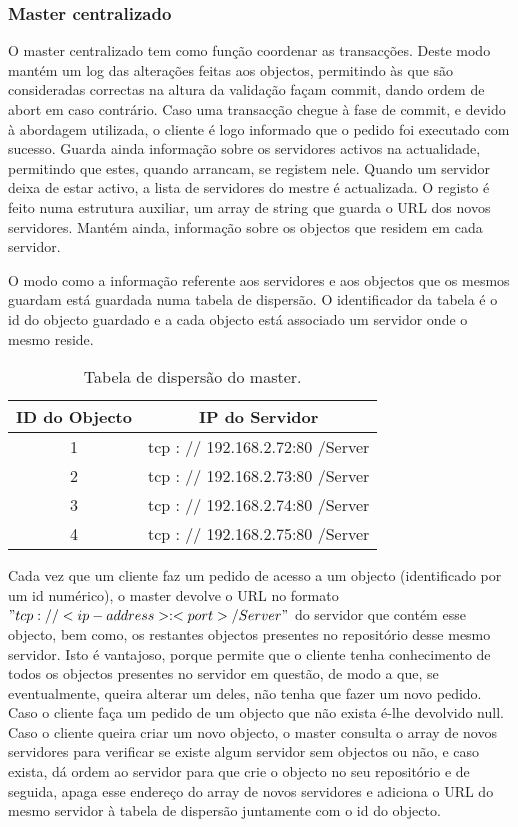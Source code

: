 \subsubsection{Master centralizado}

O master centralizado tem como função coordenar as transacções. Deste modo mantém um log das alterações feitas aos objectos, permitindo às que são consideradas correctas na altura da validação façam commit, dando ordem de abort em caso contrário. Caso uma transacção chegue à fase de commit, e devido à abordagem utilizada, o cliente é logo informado que o pedido foi executado com sucesso. Guarda ainda informação sobre os servidores activos na actualidade, permitindo que estes, quando arrancam, se registem nele. Quando um servidor deixa de estar activo, a lista de servidores do mestre é actualizada. O registo é feito numa estrutura auxiliar, um array de string que guarda o URL dos novos servidores. Mantém ainda, informação sobre os objectos que residem em cada servidor.

O modo como a informação referente aos servidores e aos objectos que os mesmos guardam está guardada numa tabela de dispersão. O identificador da tabela é o id do objecto guardado e a cada objecto está associado um servidor onde o mesmo reside.

\begin{table}
\centering
\begin{tabular}{c|c}
ID do Objecto & IP do Servidor \\\hline
1 & tcp : // 192.168.2.72:80 /Server \\
2 & tcp : // 192.168.2.73:80 /Server \\
3 & tcp : // 192.168.2.74:80 /Server \\
4 & tcp : // 192.168.2.75:80 /Server \\
\end{tabular}
\caption{\label{tab:widgets}Tabela de dispersão do master.}
\end{table}



Cada vez que um cliente faz um pedido de acesso a um objecto (identificado por um id numérico), o master devolve o URL no formato \("tcp : // <ip-address>:<port> /Server"\) do servidor que contém esse objecto, bem como, os restantes objectos presentes no repositório desse mesmo servidor.  Isto é vantajoso, porque permite que o cliente tenha conhecimento de todos os objectos presentes no servidor em questão, de modo a que, se eventualmente, queira alterar um deles, não tenha que fazer um novo pedido. Caso o cliente faça um pedido de um objecto que não exista é-lhe devolvido null. Caso o cliente queira criar um novo objecto, o master consulta o array de novos servidores para verificar se existe algum servidor sem objectos ou não, e caso exista, dá ordem ao servidor para que crie o objecto no seu repositório e de seguida, apaga esse endereço do array de novos servidores e adiciona o URL do mesmo servidor à tabela de dispersão juntamente com o id do objecto. 